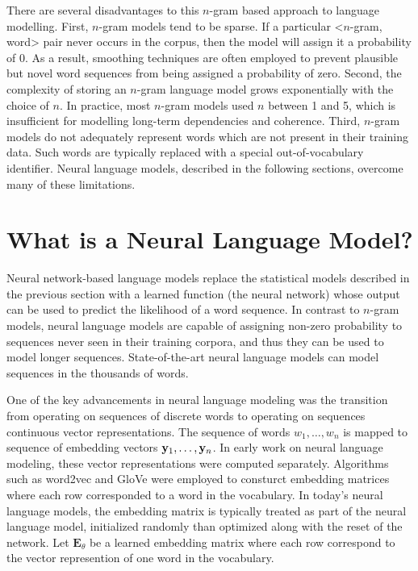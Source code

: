 There are several disadvantages to this $n$-gram based approach to language modelling.
First, $n$-gram models tend to be sparse.
If a particular <$n$-gram, word> pair never occurs in the corpus, then the model will assign it a probability of 0.
As a result, smoothing techniques are often employed to prevent plausible but novel word sequences from being assigned a probability of zero.
Second, the complexity of storing an $n$-gram language model grows exponentially with the choice of $n$.
In practice, most $n$-gram models used $n$ between 1 and 5, which is insufficient for modelling long-term dependencies and coherence.
Third, $n$-gram models do not adequately represent words which are not present in their training data.
Such words are typically replaced with a special out-of-vocabulary identifier.
Neural language models, described in the following sections, overcome many of these limitations.


\section{What is a Neural Language Model?}
\label{section:what_is_a_nlm}

Neural network-based language models replace the statistical models described in the previous section with a learned function (the neural network) whose output can be used to predict the likelihood of a word sequence.
In contrast to $n$-gram models, neural language models are capable of assigning non-zero probability to sequences never seen in their training corpora, and thus they can be used to model longer sequences.
State-of-the-art neural language models can model sequences in the thousands of words.

One of the key advancements in neural language modeling was the transition from operating on sequences of discrete words to operating on sequences continuous vector representations.
The sequence of words $w_1, \ldots, w_n$ is mapped to sequence of embedding vectors $\mathbf{y}_1, \ldots, \mathbf{y}_n$.
In early work on neural language modeling, these vector representations were computed separately.
Algorithms such as word2vec \citep{mikolov2013word2vec} and GloVe \citep{pennington2014glove} were employed to consturct embedding matrices where each row corresponded to a word in the vocabulary.
In today's neural language models, the embedding matrix is typically treated as part of the neural language model, initialized randomly than optimized along with the reset of the network.
Let $\mathbf{E}_\theta$ be a learned embedding matrix where each row correspond to the vector represention of one word in the vocabulary.

